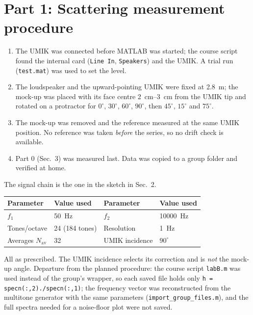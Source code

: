 \documentclass[a4paper,10pt]{article}
\newcommand{\file}[1]{\nolinkurl{#1}}
\begin{document}
\section{Part 1: Scattering measurement procedure}
\begin{enumerate}
\item The UMIK was connected before MATLAB was started; the course script found the
internal card (\texttt{Line In}, \texttt{Speakers}) and the UMIK. A trial run
(\file{test.mat}) was used to set the level.
\item The loudspeaker and the upward-pointing UMIK were fixed at \SI{2.8}{m}; the
mock-up was placed with its face centre \SIrange{2}{3}{cm} from the UMIK tip and
rotated on a protractor for $0^\circ$, $30^\circ$, $60^\circ$, $90^\circ$, then
$45^\circ$, $15^\circ$ and $75^\circ$.
\item The mock-up was removed and the reference measured at the same UMIK position.
No reference was taken \emph{before} the series, so no drift check is available.
\item Part 0 (Sec.~3) was measured last. Data was copied to a group folder and
verified at home.
\end{enumerate}
The signal chain is the one in the sketch in Sec.~2.

\par\smallskip
\begin{tabularx}{\linewidth}{@{}lXlX@{}}\toprule
Parameter & Value used & Parameter & Value used \\\midrule
$f_1$ & \SI{50}{\hertz} & $f_2$ & \SI{10000}{\hertz} \\
Tones/octave & 24 (184 tones) & Resolution & \SI{1}{\hertz} \\
Averages $N_{\mathrm{av}}$ & 32 & UMIK incidence & $90^\circ$ \\\bottomrule
\end{tabularx}\par\smallskip
All as prescribed. The UMIK incidence selects its correction and is \emph{not} the
mock-up angle. Departure from the planned procedure: the course script \file{labB.m}
was used instead of the group's wrapper, so each saved file holds only
\file{h = specn(:,2)./specn(:,1)}; the frequency vector was reconstructed from the
multitone generator with the same parameters (\file{import_group_files.m}), and the
full spectra needed for a noise-floor plot were not saved.

\newpage
\end{document}
